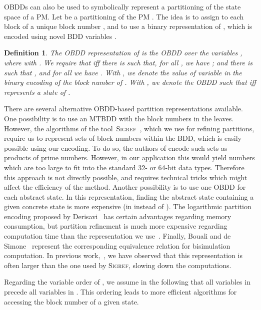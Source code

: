 \documentclass[10pt,twocolumn]{article}
\newtheorem{definition}{Definition}
\newcommand{\SIGREF}{\textsc{Sigref}\xspace}
\begin{document}
OBDDs can also be used to symbolically represent a partitioning of the state space of a PM.
Let  be a partitioning of the PM .
The idea is to assign to each block  of  a unique block number , and to use a binary representation of , which is encoded using  novel BDD variables .
\begin{definition}
  \label{def:bdd-partitioning}
The \emph{OBDD representation} of  is the OBDD  over the variables , where  with .
  We require that  iff there is  such that, for all ,
  we have ; and there is  such that , and for all  we have .
  With , we denote the value of variable  in the binary encoding of the block number  of .
  With , we denote the OBDD such that  iff  represents a state of .
\end{definition}

There are several alternative OBDD-based partition representations available.
One possibility is to use an MTBDD with the block numbers in the leaves.
However, the algorithms of the tool~\SIGREF~\cite{wimmer-et-al-atva-2006}, which we use
for refining partitions, require us to represent sets of block numbers within the BDD, 
which is easily possible using our encoding. To do so, the authors of \cite{Santos13}
encode such sets as products of prime numbers. However, in our application this would yield numbers which are too 
large to fit into the standard 32- or 64-bit data types. Therefore this approach is not directly 
possible, and requires technical tricks which might affect the efficiency of the method.
Another possibility is to use one OBDD for each abstract state. In this representation,
finding the abstract state containing a given concrete state is more expensive
(in  instead of ).
The logarithmic partition encoding proposed by Derisavi~\cite{Der07a} has certain advantages 
regarding memory consumption, but partition refinement is much more expensive regarding 
computation time than the representation we use~\cite{wimmer-et-al-perfeval-2010}.
Finally, Bouali and de Simone~\cite{BdS92} represent the corresponding equivalence
relation for bisimulation computation. In previous work,~\cite{wimmer-et-al-atva-2006},
we have observed that this representation is often larger than the one used by \SIGREF, 
slowing down the computations.

Regarding the variable order of , we assume in
the following that all variables in  precede all variables
in . This ordering leads to more efficient algorithms for accessing the
block number of a given state.
\end{document}
